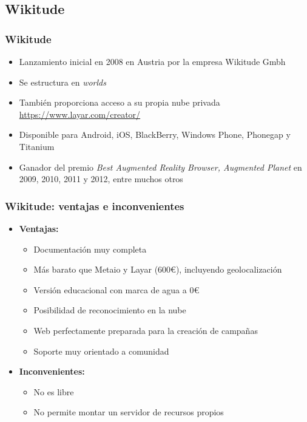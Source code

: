 \subsection*{Wikitude}
\frame
{
\frametitle{Wikitude}
\begin{itemize}
 \item Lanzamiento inicial en 2008 en Austria por la empresa Wikitude Gmbh
 \item Se estructura en \textit{worlds}
 \item También proporciona acceso a su propia nube privada\\
   \url{https://www.layar.com/creator/}
 \item Disponible para Android, iOS, BlackBerry, Windows Phone, Phonegap y Titanium
 \item Ganador del premio \textit{Best Augmented Reality Browser, Augmented Planet} en 2009, 2010, 2011 y 2012, entre muchos otros
\end{itemize}
}

\frame
{
\frametitle{Wikitude: ventajas e inconvenientes}
\begin{itemize}
\item \textbf{Ventajas:}
  \begin{itemize}
   \item Documentación muy completa
   \item Más barato que Metaio y Layar (600\euro), incluyendo geolocalización
   \item Versión educacional con marca de agua a 0\euro
   \item Posibilidad de reconocimiento en la nube
   \item Web perfectamente preparada para la creación de campañas
   \item Soporte muy orientado a comunidad
  \end{itemize}

\item \textbf{Inconvenientes:}
  \begin{itemize}
   \item No es libre
   \item No permite montar un servidor de recursos propios
  \end{itemize}

\end{itemize}
}

